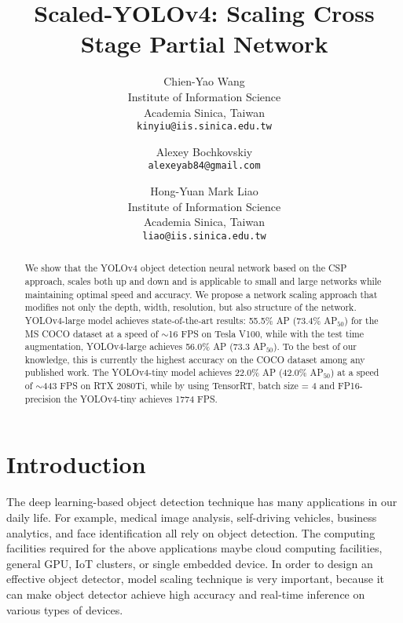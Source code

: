 \documentclass[10pt,twocolumn,letterpaper]{article}
\begin{document}
\title{Scaled-YOLOv4: Scaling Cross Stage Partial Network}

\author{Chien-Yao Wang\\
Institute of Information Science\\
Academia Sinica, Taiwan\\
{\tt\small kinyiu@iis.sinica.edu.tw}
\and
Alexey Bochkovskiy\\
{\tt\small alexeyab84@gmail.com}
\and
Hong-Yuan Mark Liao\\
Institute of Information Science\\
Academia Sinica, Taiwan\\
{\tt\small liao@iis.sinica.edu.tw}
}

\maketitle


\begin{abstract}
	We show that the YOLOv4 object detection neural network based on the CSP approach, scales both up and down and is applicable to small and large networks while maintaining optimal speed and accuracy. We propose a network scaling approach that modifies not only the depth, width, resolution, but also structure of the network. YOLOv4-large model achieves state-of-the-art results: 55.5\% AP (73.4\% AP$_{50}$) for the MS COCO dataset at a speed of  $\sim$16 FPS on Tesla V100, while with the test time augmentation, YOLOv4-large achieves 56.0\% AP (73.3 AP$_{50}$). To the best of our knowledge, this is currently the highest accuracy on the COCO dataset among any published work. The YOLOv4-tiny model achieves 22.0\% AP (42.0\% AP$_{50}$) at a speed of $\sim$443 FPS on RTX 2080Ti, while by using TensorRT, batch size = 4 and FP16-precision the YOLOv4-tiny achieves 1774 FPS.
\end{abstract}

\section{Introduction}

The deep learning-based object detection technique has many applications in our daily life. For example, medical image analysis, self-driving vehicles, business analytics, and face identification all rely on object detection.  The computing facilities required for the above applications maybe cloud computing facilities, general GPU, IoT clusters, or single embedded device.  In order to design an effective object detector, model scaling technique is very important, because it can make object detector achieve high accuracy and real-time inference on various types of devices.
\end{document}
